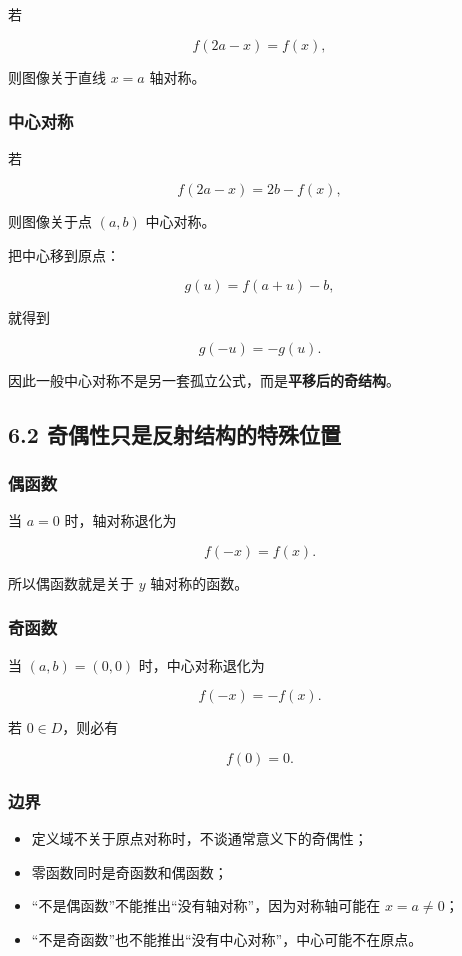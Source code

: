 \documentclass[11pt,a4paper]{ctexart}
\providecommand{\tightlist}{}
\begin{document}
若

\[
\boxed{f(2a-x)=f(x)},
\]

则图像关于直线 \(x=a\) 轴对称。

\subsubsection{中心对称}\label{ux4e2dux5fc3ux5bf9ux79f0}

若

\[
\boxed{f(2a-x)=2b-f(x)},
\]

则图像关于点 \((a,b)\) 中心对称。

把中心移到原点：

\[
g(u)=f(a+u)-b,
\]

就得到

\[
g(-u)=-g(u).
\]

因此一般中心对称不是另一套孤立公式，而是\textbf{平移后的奇结构}。

\subsection{6.2
奇偶性只是反射结构的特殊位置}\label{ux5947ux5076ux6027ux53eaux662fux53cdux5c04ux7ed3ux6784ux7684ux7279ux6b8aux4f4dux7f6e}

\subsubsection{偶函数}\label{ux5076ux51fdux6570}

当 \(a=0\) 时，轴对称退化为

\[
\boxed{f(-x)=f(x)}.
\]

所以偶函数就是关于 \(y\) 轴对称的函数。

\subsubsection{奇函数}\label{ux5947ux51fdux6570}

当 \((a,b)=(0,0)\) 时，中心对称退化为

\[
\boxed{f(-x)=-f(x)}.
\]

若 \(0\in D\)，则必有

\[
f(0)=0.
\]

\subsubsection{边界}\label{ux8fb9ux754c}

\begin{itemize}
\tightlist
\item
  定义域不关于原点对称时，不谈通常意义下的奇偶性；
\item
  零函数同时是奇函数和偶函数；
\item
  ``不是偶函数''不能推出``没有轴对称''，因为对称轴可能在 \(x=a\ne0\)；
\item
  ``不是奇函数''也不能推出``没有中心对称''，中心可能不在原点。
\end{itemize}
\end{document}

